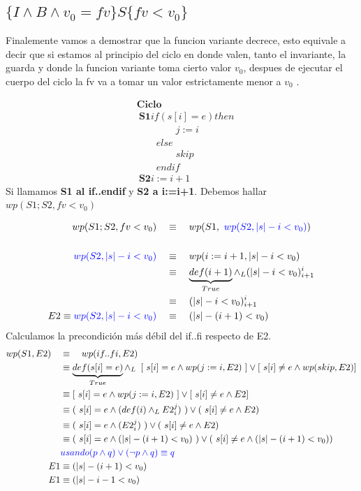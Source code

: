 \documentclass[12pt]{book}
\begin{document}
\subsection{$ \{ I \wedge B \wedge v_0 = fv \}  S \{fv < v_0 \}$ }
Finalemente vamos a demostrar que la funcion variante decrece, esto equivale a decir que si estamos al principio del ciclo en donde valen, tanto el invariante, la guarda y donde la funcion variante toma cierto valor $v_0$, despues de ejecutar el cuerpo del ciclo la fv va a tomar un valor estrictamente menor a $v_0 $ .
\begin{shaded}
\begin{align*}
& \textbf{Ciclo} \\
& \ \textbf{S1}if (s[i] = e)  then  \\
& \qquad \qquad j:= i \\
& \qquad else \\
& \qquad \qquad skip \\
& \qquad endif \\
& \ \textbf{S2} i:= i + 1 
\end{align*}
Si llamamos \textbf{S1 al if..endif} y \textbf{S2 a i:=i+1}. 
Debemos hallar $wp (S1;S2, fv < v_0) $
\end{shaded}
\begin{align*}
wp (S1;S2, fv < v_0)\quad & \equiv \quad wp (S1, \ \textcolor{blue}{wp (S2, |s|-i < v_0)}) \\ \\
\textcolor{blue}{wp (S2, |s|-i < v_0)} \quad & \equiv \quad wp (i:= i + 1 , |s|-i < v_0) \\
& \equiv \quad \underbrace{ def( i + 1)}_{True} \wedge_L (|s|-i < v_0)_{i+1}^i \\
& \equiv \quad (|s|-i < v_0)_{i+1}^i \\
E2 \equiv \textcolor{blue}{wp (S2, |s|-i < v_0)}\quad  & \equiv \quad (|s|-(i+1) < v_0)
\end{align*}
Calculamos la precondici\'on m\'as d\'ebil del if..fi respecto de E2.
\begin{align*}
wp (S1,E2) \quad & \equiv \quad wp (if..fi ,E2)  \\
&\equiv \underbrace{ def(s[i] = e )}_{True} \land_L 
 \ \left[ \ s[i] = e \land wp(j := i, E2)  \ \right] \lor \left[ \ s[i] \neq e \land wp(skip, E2)\right] \\
&\equiv  \left[ \ s[i] = e \land wp(j := i, E2)  \ \right] \lor \left[ \ s[i] \neq e \land  E2 \right] \\
&\equiv ( \ s[i] = e \land (def(i) \wedge_L E2_i^j)  \ ) \lor ( \ s[i] \neq e \land  E2 ) \\
&\equiv ( \ s[i] = e \land ( E2_i^j)  \ ) \lor ( \ s[i] \neq e \land  E2 ) \\
&\equiv ( \ s[i] = e \land (|s|-(i+1) < v_0)  \ ) \lor ( \ s[i] \neq e \land (|s|-(i+1) < v_0) ) \\
& \textcolor{blue}{ usando (p \wedge q )\vee(\neg p \wedge q ) \equiv q } \\
E1 &\equiv (|s|-(i+1) < v_0) \\
E1 &\equiv (|s|-i-1 < v_0) \\
\end{align*}
\end{document}
